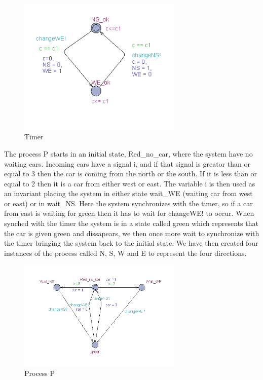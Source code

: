 \documentclass[12pt]{article}
\begin{document}
\begin{figure}[h]
  \centering
  \includegraphics[width=0.7\textwidth]{timer.png}
  \caption{Timer}
  \label{fig:timer}
\end{figure}

The process P starts in an initial state, Red\_no\_car, where the system have no waiting cars. Incoming cars have a signal i, and if that signal is greator than or equal to 3 then the car is coming from the north or the south. If it is less than or equal to 2 then it is a car from either west or east. The  variable i is then used as an invariant placing the system in either state wait\_WE (waiting car from west or east) or in wait\_NS. Here the system synchronizes with the timer, so if a car from east is waiting for green then it has to wait for changeWE! to occur. When synched with the timer the system is in a state called green which represents that the car is given green and dissapears, we then once more wait to synchronize with the timer bringing the system back to the initial state. We have then created four instances of the process called N, S, W and E to represent the four directions.

\begin{figure}[h]
  \centering
  \includegraphics[width=0.7\textwidth]{trafficlight.png}
  \caption{Process P}
  \label{fig:p}
\end{figure}
\end{document}
